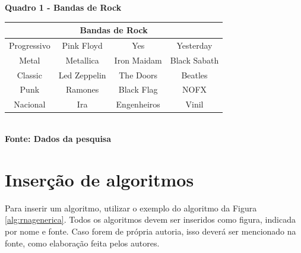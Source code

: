    \begin{center}
          \centering
       	\textbf{Quadro 1 - Bandas de Rock}\\
        \label{quadro1}
	\begin{tabular}{|c|c|c|c|} \hline
	\multicolumn{4}{|c|}{Bandas de Rock} 	  \\ 
		\hline 	Progressivo & Pink Floyd & Yes	& Yesterday \\ 
		 \hline Metal  & Metallica & Iron Maidam & Black Sabath \\ 
		\hline 	Classic & Led Zeppelin	& The Doors & Beatles \\ 
		\hline 	Punk & Ramones & Black Flag & NOFX	\\ 
		\hline 	Nacional & Ira & Engenheiros & Vinil	\\ 
		\hline
	\end{tabular}
	\vspace{0.1cm} 
	{\footnotesize\\ \textbf{Fonte: Dados da pesquisa}}
   \end{center}


\section{\hspace{-0.3cm}Inserção de algoritmos}

Para inserir um algoritmo, utilizar o exemplo do algoritmo da Figura \ref{alg:rnagenerica}.
Todos os algoritmos devem ser inseridos como figura, indicada por nome e  fonte. Caso 
forem de própria autoria, isso deverá ser mencionado na fonte, como elaboração feita pelos autores.

